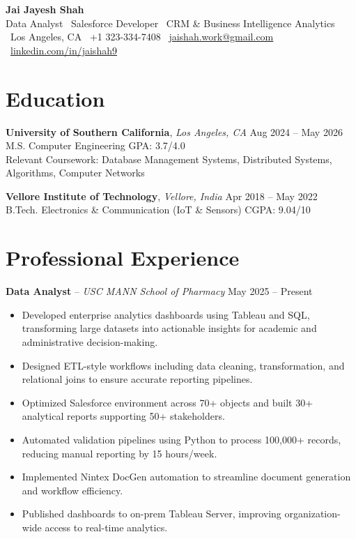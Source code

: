 \documentclass[letterpaper,11pt]{article}
\begin{document}
\begin{center}
    {\LARGE \textbf{Jai Jayesh Shah}}\\
    {\normalsize Data Analyst \textbar\ Salesforce Developer \textbar\ CRM \& Business Intelligence Analytics} \\
    \small
    \faMapMarker*\ Los Angeles, CA
    \quad
    \faPhone*\ +1 323-334-7408
    \quad
    \faEnvelope\ \href{mailto:jaishah.work@gmail.com} {jaishah.work@gmail.com}
    \quad
    \faLinkedin\ \href{https://www.linkedin.com/in/jaishah9} {linkedin.com/in/jaishah9}
\end{center}
\vspace{-13pt}

\section*{Education}

\textbf{University of Southern California}, \textit{Los Angeles, CA} \hfill Aug 2024 -- May 2026 \\
M.S. Computer Engineering \hfill GPA: 3.7/4.0 \\
Relevant Coursework: Database Management Systems, Distributed Systems, Algorithms, Computer Networks

\vspace{4pt}

\textbf{Vellore Institute of Technology}, \textit{Vellore, India }\hfill Apr 2018 -- May 2022 \\
B.Tech. Electronics \& Communication (IoT \& Sensors) \hfill CGPA: 9.04/10

\section*{Professional Experience}

\textbf{Data Analyst} – \textit{USC MANN School of Pharmacy} \hfill May 2025 -- Present
\begin{itemize}
\item Developed enterprise analytics dashboards using Tableau and SQL, transforming large datasets into actionable insights for academic and administrative decision-making.
\item Designed ETL-style workflows including data cleaning, transformation, and relational joins to ensure accurate reporting pipelines.
\item Optimized Salesforce environment across 70+ objects and built 30+ analytical reports supporting 50+ stakeholders.
\item Automated validation pipelines using Python to process 100,000+ records, reducing manual reporting by 15 hours/week.
\item Implemented Nintex DocGen automation to streamline document generation and workflow efficiency.
\item Published dashboards to on-prem Tableau Server, improving organization-wide access to real-time analytics.
\end{itemize}
\end{document}
